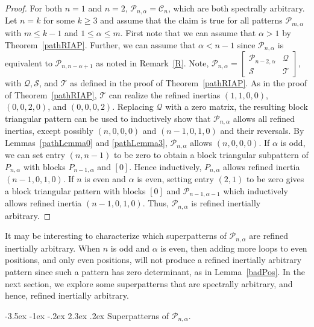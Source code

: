 \documentclass[10pt]{amsart}
\begin{document}
\begin{proof}
For both $n = 1$ and $n = 2$, ${\mathcal{P}}_{n, \alpha} = {\mathcal{C}}_n$, which are both spectrally arbitrary. 
Let $n = k$ for some $k\geq 3$ and assume that the claim is true for all patterns
${\mathcal{P}}_{m,\alpha}$ with $m\leq k-1$ and $1\leq \alpha \leq m$.
 First note that we can assume that $\alpha >1$ by Theorem~\ref{pathRIAP}.
Further,  we can assume that $\alpha < n-1$ since ${\mathcal{P}}_{n, \alpha}$ is equivalent to ${\mathcal{P}}_{n, n-\alpha+1}$
 as noted in Remark~\ref{R}. Note, ${\mathcal{P}}_{n, \alpha} = \left[ \begin{array}{cc}
{\mathcal{P}}_{n-2, \alpha} 	& {\mathcal{Q}} \\
{\mathcal{S}} 			    & {\mathcal{T}} \end{array} \right]$, with ${\mathcal{Q}}, {\mathcal{S}}$, and ${\mathcal{T}}$ as defined in the proof of 
Theorem~\ref{pathRIAP}. As in the proof of Theorem~\ref{pathRIAP}, 
${\mathcal{T}}$ can realize the refined inertias $(1, 1, 0, 0)$, $(0, 0, 2, 0)$, and $(0, 0, 0, 2)$. 
Replacing ${\mathcal{Q}}$ with a zero matrix, the resulting block triangular pattern can be used to inductively show that
${\mathcal{P}}_{n,\alpha}$ allows all refined inertias, except possibly $(n, 0, 0, 0)$ and $(n-1, 0, 1, 0)$ and their reversals. 
 By Lemmas~\ref{pathLemma0} and \ref{pathLemma3}, ${\mathcal{P}}_{n, \alpha}$ allows $(n, 0, 0, 0)$. 
If $\alpha$ is odd, we can set entry $(n,n-1)$ to be zero to obtain a block triangular
subpattern of $P_{n,\alpha}$ with blocks $P_{n-1,\alpha}$ and $[0]$. Hence inductively, $P_{n,\alpha}$ 
allows refined inertia $(n-1, 0, 1, 0)$. If $n$ is even and $\alpha$ is even, setting
entry $(2,1)$ to be zero gives a block triangular pattern with blocks $[0]$ and ${\mathcal{P}}_{n-1,\alpha -1}$
which inductively allows refined inertia $(n-1,0,1,0)$.
 Thus, ${\mathcal{P}}_{n, \alpha}$ is refined inertially arbitrary.
\end{proof}

It may be interesting to characterize which superpatterns of ${\mathcal{P}}_{n,\alpha}$ are refined inertially arbitrary.
When $n$ is odd and $\alpha$ is even, then adding more loops to even positions, and only even positions, will not produce 
a refined inertially arbitrary pattern since such a pattern has zero determinant, as in Lemma~\ref{badPos}.
In the next section, we explore some superpatterns that are spectrally arbitrary, and hence, refined inertially arbitrary. 

{               
                                      {-3.5ex \@plus -1ex \@minus -.2ex}                                      {2.3ex \@plus.2ex}                                                      {\normalfont\bfseries}}{Superpatterns of ${\mathcal{P}}_{n,\alpha}$.}\label{supersection}
\end{document}
